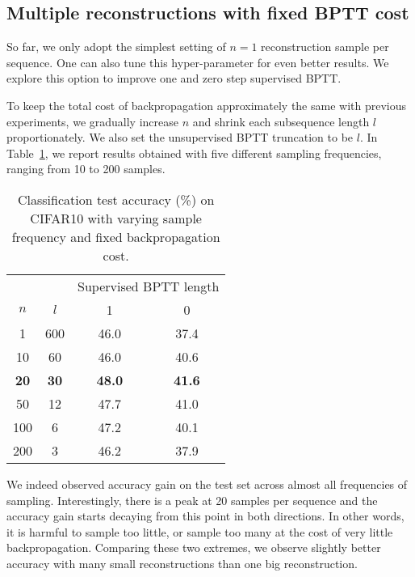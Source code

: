 \documentclass{article}
\begin{document}
\subsection{Multiple reconstructions with fixed BPTT cost} \label{sec:sample_frequency}

So far, we only adopt the simplest setting of $n=1$ reconstruction sample per sequence. One can also tune this hyper-parameter for even better results. We explore this option to improve one and zero step supervised BPTT. 

To keep the total cost of backpropagation approximately the same with previous experiments, we gradually increase $n$ and shrink each subsequence length $l$ proportionately. We also set the unsupervised BPTT truncation to be $l$. In Table~\ref{tab:sample_rate}, we report results obtained with five different sampling frequencies, ranging from 10 to 200 samples.

\begin{table}[htb]
\caption{Classification test accuracy (\%) on CIFAR10 with varying sample frequency and fixed backpropagation cost.}
\label{tab:sample_rate}
\vskip 0.15in
\begin{center}
\begin{small}

\begin{tabular}{cccc}
\toprule
 & & \multicolumn{2}{c}{Supervised BPTT length} \\
\cmidrule(lr){3-4}
$n$ & $l$ & 1 & 0 \\
\midrule
1 & 600 & 46.0 & 37.4 \\
10 & 60     & 46.0 & 40.6  \\
\textbf{20} & \textbf{30}  &  \textbf{48.0} & \textbf{41.6}  \\
50 & 12  &  47.7 & 41.0  \\
100 & 6 & 47.2 & 40.1  \\
200 & 3 &   46.2 & 37.9 \\
\bottomrule
\end{tabular}
\end{small}
\end{center}
\vskip -0.1in
\end{table}


We indeed observed accuracy gain on the test set across almost all frequencies of sampling. Interestingly, there is a peak at 20 samples per sequence and the accuracy gain starts decaying from this point in both directions. In other words, it is harmful to sample too little, or sample too many at the cost of very little backpropagation. Comparing these two extremes, we observe slightly better accuracy with many small reconstructions than one big reconstruction. 
\end{document}
